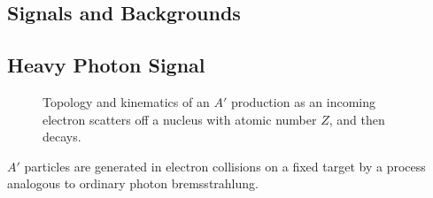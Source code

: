 \documentclass[b1]{sciposter}
\begin{document}
\begin{multicols}{3}
	\section*{Signals and Backgrounds}
	\subsection*{Heavy Photon Signal}
%

\begin{figure}
		\begin{center}
		\end{center}
		\caption{Topology and kinematics of an $A'$ production as an incoming electron scatters off a nucleus with atomic number $Z$, and then decays.}
	\end{figure}


	$A'$ particles are generated in electron collisions on a fixed target by a process analogous to
	ordinary photon bremsstrahlung.



\end{multicols}
\end{document}
